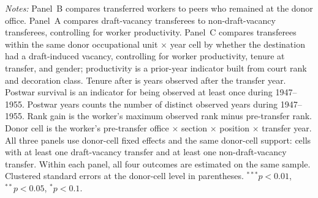 \begin{table}[htbp]
\begin{threeparttable}
\begin{tablenotes}[flushleft]
\item \textit{Notes:} Panel~B compares transferred workers to peers who remained at the donor office. Panel~A compares draft-vacancy transferees to non-draft-vacancy transferees, controlling for worker productivity. Panel~C compares transferees within the same donor occupational unit $\times$ year cell by whether the destination had a draft-induced vacancy, controlling for worker productivity, tenure at transfer, and gender; productivity is a prior-year indicator built from court rank and decoration class. Tenure after is years observed after the transfer year. Postwar survival is an indicator for being observed at least once during 1947--1955. Postwar years counts the number of distinct observed years during 1947--1955. Rank gain is the worker's maximum observed rank minus pre-transfer rank. Donor cell is the worker's pre-transfer office $\times$ section $\times$ position $\times$ transfer year. All three panels use donor-cell fixed effects and the same donor-cell support: cells with at least one draft-vacancy transfer and at least one non-draft-vacancy transfer. Within each panel, all four outcomes are estimated on the same sample. Clustered standard errors at the donor-cell level in parentheses. $^{***}p<0.01$, $^{**}p<0.05$, $^{*}p<0.1$.
\end{tablenotes}
\end{threeparttable}
\end{table}
